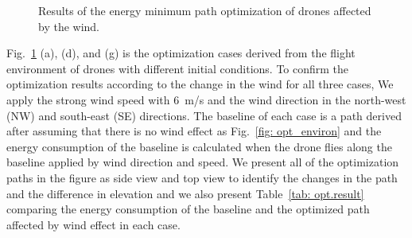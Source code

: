 \documentclass[journal]{./template/IEEEtran}
\begin{document}
\begin{figure}[ht]
\caption{Results of the energy minimum path optimization of drones affected by the wind.}
\label{fig: wind_opt}
\end{figure}

Fig.~\ref{fig: wind_opt} (a), (d), and (g) is the optimization cases derived from the flight environment of drones with different initial conditions.
To confirm the optimization results according to the change in the wind for all three cases, We apply the strong wind speed with 6~m/s and the wind direction in the north-west (NW) and south-east (SE) directions.
The baseline of each case is a path derived after assuming that there is no wind effect as Fig.~\ref{fig: opt_environ} and the energy consumption of the baseline is calculated when the drone flies along the baseline applied by wind direction and speed.
We present all of the optimization paths in the figure as side view and top view to identify the changes in the path and the difference in elevation and we also present Table~\ref{tab: opt.result} comparing the energy consumption of the baseline and the optimized path affected by wind effect in each case.
\end{document}
